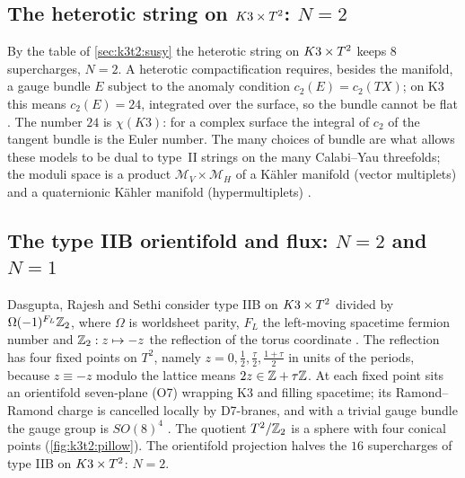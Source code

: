 \subsection{The heterotic string on \texorpdfstring{$K3\times T^2$}{K3 x T2}: \texorpdfstring{$N=2$}{N=2}}
By the table of \cref{sec:k3t2:susy} the heterotic string on $K3\times T^2$ keeps $8$ supercharges,
$N=2$. A heterotic compactification requires, besides the manifold, a gauge bundle $E$ subject
to the anomaly condition $c_2(E)=c_2(TX)$; on K3 this means $c_2(E)=24$, integrated over the
surface, so the bundle cannot be flat . The number $24$ is
$\chi(K3)$: for a complex surface the integral of $c_2$ of the tangent bundle is the Euler
number. The many choices of bundle are what allows these models to be dual to type~II
strings on the many Calabi--Yau threefolds; the moduli space is a product
$\mathcal M_V\times\mathcal M_H$ of a K\"ahler manifold (vector multiplets) and a
quaternionic K\"ahler manifold (hypermultiplets) .

\subsection{The type IIB orientifold and flux: \texorpdfstring{$N=2$ and $N=1$}{N=2 and N=1}}
Dasgupta, Rajesh and Sethi consider type IIB on $K3\times T^2$ divided by
$\Omega(-1)^{F_L}\mathbb{Z}_2$, where $\Omega$ is worldsheet parity, $F_L$ the left-moving spacetime
fermion number and $\mathbb{Z}_2:z\mapsto-z$ the reflection of the torus coordinate
. The reflection has four fixed points
on $T^2$, namely $z=0,\tfrac12,\tfrac\tau2,\tfrac{1+\tau}2$ in units of the periods, because
$z\equiv-z$ modulo the lattice means $2z\in\mathbb{Z}+\tau\mathbb{Z}$. At each fixed point sits an orientifold
seven-plane (O7) wrapping K3 and filling spacetime; its Ramond--Ramond charge is cancelled
locally by D7-branes, and with a trivial gauge bundle the gauge group is $SO(8)^4$
. The quotient $T^2/\mathbb{Z}_2$ is a sphere with four conical
points (\cref{fig:k3t2:pillow}). The orientifold projection halves the $16$ supercharges of
type IIB on $K3\times T^2$: $N=2$.

